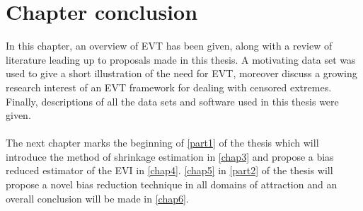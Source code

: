 \section{Chapter conclusion}
In this chapter, an overview of EVT has been given, along with a review of literature leading up to proposals made in this thesis. A motivating data set was used to give a short illustration of the need for EVT, moreover discuss a growing research interest of an EVT framework for dealing with censored extremes. Finally, descriptions of all the data sets and software used in this thesis were given.
\\\\
The next chapter marks the beginning of \autoref{part1} of the thesis which will introduce the method of shrinkage estimation in \autoref{chap3} and propose a bias reduced estimator of the EVI in \autoref{chap4}. \autoref{chap5} in \autoref{part2} of the thesis will propose a novel bias reduction technique in all domains of attraction and an overall conclusion will be made in \autoref{chap6}.
